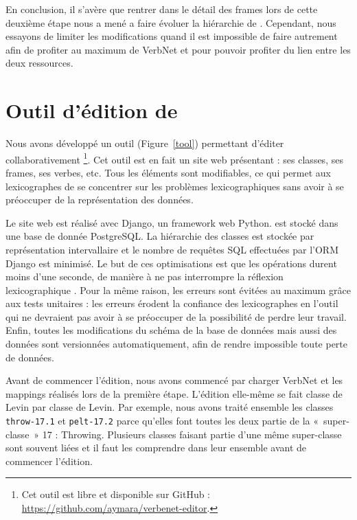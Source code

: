 En conclusion, il s'avère que rentrer dans le détail des frames lors de cette
deuxième étape nous a mené a faire évoluer la hiérarchie de \verbenet{}.
Cependant, nous essayons de limiter les modifications quand il est impossible
de faire autrement afin de profiter au maximum de VerbNet et pour pouvoir
profiter du lien entre les deux ressources.

\section{Outil d'édition de \verbenet{}}\label{toolquentin}

Nous avons développé un outil (Figure~\ref{tool}) permettant d'éditer collaborativement
\verbenet{}\footnote{Cet outil est libre et disponible sur GitHub :
\url{https://github.com/aymara/verbenet-editor}.}. Cet outil est en fait un
site web présentant \verbenet{}: ses classes, ses frames, ses verbes, etc.
Tous les éléments sont modifiables, ce qui permet aux lexicographes de se
concentrer sur les problèmes lexicographiques sans avoir à se préoccuper de la
représentation des données.

Le site web est réalisé avec Django, un framework web Python. \verbenet{} est
stocké dans une base de donnée PostgreSQL. La hiérarchie des classes est
stockée par représentation intervallaire et le nombre de requêtes SQL
effectuées par l'ORM Django est minimisé. Le but de ces optimisations est que
les opérations durent moins d'une seconde, de manière à ne pas interrompre la
réflexion lexicographique \citep{nielsen1994response}. Pour la même raison, les
erreurs sont évitées au maximum grâce aux tests unitaires : les erreurs érodent
la confiance des lexicographes en l'outil qui ne devraient pas avoir à se
préoccuper de la possibilité de perdre leur travail. Enfin, toutes les
modifications du schéma de la base de données mais aussi des données sont
versionnées automatiquement, afin de rendre impossible toute perte de données.

Avant de commencer l'édition, nous avons commencé par charger VerbNet et les
mappings réalisés lors de la première étape. L'édition elle-même se fait classe
de Levin par classe de Levin. Par exemple, nous avons traité ensemble les
classes {\color{blue}\texttt{throw-17.1}} et {\color{blue}\texttt{pelt-17.2}}
parce qu'elles font toutes les deux partie de la «~super-classe~» 17 :
Throwing.  Plusieurs classes faisant partie d'une même super-classe sont
souvent liées et il faut les comprendre dans leur ensemble avant de commencer
l'édition.

